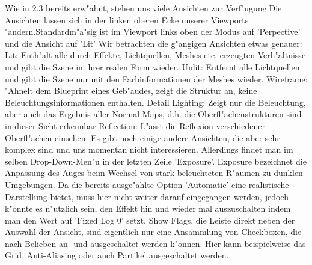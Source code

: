\documentclass[11pt, titlepage]{article}
\begin{document}
\noindent Wie in 2.3 bereits erw"ahnt, stehen uns viele Ansichten zur Verf"ugung.Die Ansichten lassen sich in der linken oberen Ecke unserer Viewports "andern.Standardm"a"sig ist im Viewport links oben der Modus auf 'Perpective' und die Ansicht auf 'Lit' Wir betrachten die g"angigen Ansichten etwas genauer: \newline
\newline
\noindent Lit: Enth"alt alle durch Effekte, Lichtquellen, Meshes etc. erzeugten Verh"altnisse und gibt die Szene in ihrer realen Form wieder. \newline
\newline
\noindent Unlit: Entfernt alle Lichtquellen und gibt die Szene nur mit den Farbinformationen der Meshes wieder. \newline
\newline
\noindent Wireframe: "Ahnelt dem Blueprint eines Geb"audes, zeigt die Struktur an, keine Beleuchtungsinformationen enthalten. \newline
\newline
\noindent Detail Lighting: Zeigt nur die Beleuchtung, aber auch das Ergebnis aller Normal Maps, d.h. die Oberfl"achenstrukturen sind in dieser Sicht erkennbar \newline
\newline
\noindent Reflection: L"asst die Reflexion verschiedener Oberfl"achen einsehen. \newline
\newline
\newline
\noindent Es gibt noch einige andere Ansichten, die aber sehr komplex sind und uns momentan nicht interessieren. Allerdings findet man im selben Drop-Down-Men"u in der letzten Zeile 'Exposure'. Exposure bezeichnet die Anpassung des Auges beim Wechsel von stark beleuchteten R"aumen zu dunklen Umgebungen. Da die bereits ausge"ahlte Option 'Automatic' eine realistische Darstellung bietet, muss hier nicht weiter darauf eingegangen werden, jedoch k"onnte es n"utzlich sein, den Effekt hin und wieder mal auszuschalten indem man den Wert auf 'Fixed Log 0' setzt. \newline
\newline
\noindent Show Flags, die Leiste direkt neben der Auswahl der Ansicht, sind eigentlich nur eine Ansammlung von Checkboxen, die nach Belieben an- und ausgeschaltet werden k"onnen. Hier kann beispielweise das Grid, Anti-Aliasing oder auch Partikel ausgeschaltet werden. \newline
\newline
\end{document}
